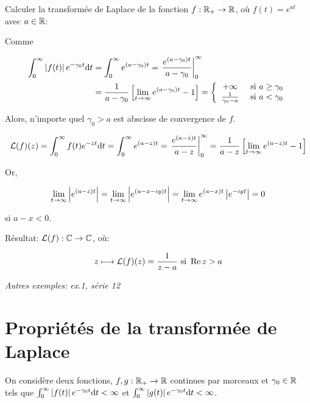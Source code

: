 \begin{example}[2]
Calculer la transformée de Laplace de la fonction $f: \mathbb{R}_+ \rightarrow \mathbb{R}$, où $f(t) = e^{at}$ avec $a \in \mathbb{R}$:

Comme 

\begin{align*}
    \int_0^\infty \left|f(t)\right| e^{-\gamma_0 t} \mathrm{d}t 
    &= \int_0^\infty e^{(a - \gamma_0)t}
    = \left.
    \frac{e^{(a - \gamma_0)t}}{a - \gamma_0}
    \right|_0^\infty
    \\& = \frac{1}{a - \gamma_0} \left[ \lim_{t \rightarrow \infty} e^{(a - \gamma_0)t} - 1 \right]
    = \left\{
    \begin{array}{clc}
    +\infty & \textrm{ si } a \geq \gamma_0\\
    \frac{1}{\gamma_0 - a} & \textrm{ si } a < \gamma_0
    \end{array}\right.
\end{align*}

Alors, n'importe quel $\gamma_0 > a$ est abscisse de convergence de $f$.

\[
    \mathcal{L}(f)(z)
    = \int_0^\infty f(t) e^{-z t} \mathrm{d}t 
    = \int_0^\infty e^{(a - z)t}
    = \left.
    \frac{e^{(a - z)t}}{a - z}
    \right|_0^\infty
    = \frac{1}{a - z} \left[ \lim_{t \rightarrow \infty} e^{(a - z)t} - 1 \right]
\]

Or,

\[
    \lim_{t \rightarrow \infty} \left|e^{(a - z)t}\right|
    = \lim_{t \rightarrow \infty} \left|e^{(a - x - iy)t}\right|
    = \lim_{t \rightarrow \infty} e^{(a - x)t} \left|e^{- iyt}\right|
    = 0
\]

si $a - x < 0$.

Résultat: $\mathcal{L}(f): \mathbb{C} \rightarrow \mathbb{C}$, où:

\[
z \longmapsto \mathcal{L}(f)(z) = \frac{1}{z - a} \textrm{ si } \operatorname{Re} z > a
\]

\textit{Autres exemples: ex.1, série 12}

\end{example}


\section{Propriétés de la transformée de Laplace}

On considère deux fonctions, $f,g: \mathbb{R}_+ \rightarrow \mathbb{R}$ continues par morceaux et $\gamma_0 \in \mathbb{R}$ tels que $\int_{0}^{\infty} \left|f(t)\right| e^{-\gamma_0 t} \mathrm{d}t < \infty$ et $\int_{0}^{\infty} \left|g(t)\right| e^{-\gamma_0 t} \mathrm{d}t < \infty$.


